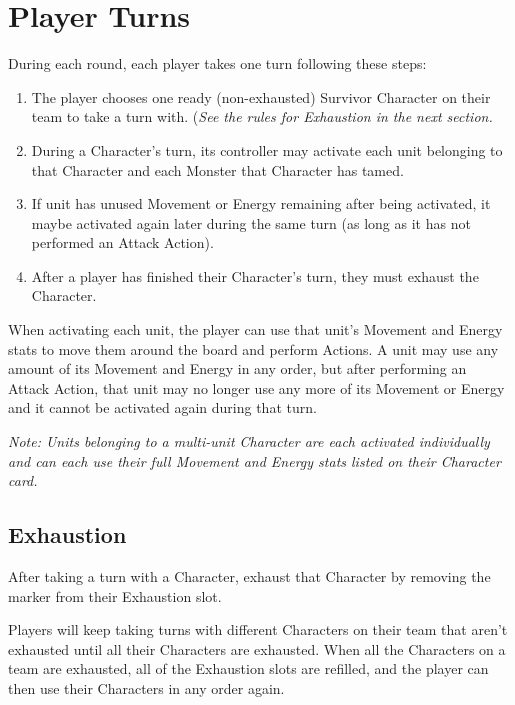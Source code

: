 \documentclass[../main.tex]{subfiles}
\begin{document}
\section{Player Turns}
During each round, each player takes one turn following these steps: 
\begin{enumerate}
    \item The player chooses one ready (non-exhausted) Survivor Character on their team to take a turn with. (\textit{See the rules for Exhaustion in the next section.}
    \item During a Character's turn, its controller may activate each unit belonging to that Character and each Monster that Character has tamed. 
    \item If  unit has unused Movement or Energy remaining after being activated, it maybe activated again later during the same turn (as long as it has not performed an Attack Action). 
    \item After a player has finished their Character's turn, they must exhaust the Character. 
\end{enumerate}

When activating each unit, the player can use that unit's Movement and Energy stats to move them around the board and perform Actions. A unit may use any amount of its Movement and Energy in any order, but after performing an Attack Action, that unit may no longer use any more of its Movement or Energy and it cannot be activated again during that turn. 

\textit{Note: Units belonging to a multi-unit Character are each activated individually and can each use their full Movement and Energy stats listed on their Character card. }

\subsection{Exhaustion}
After taking a turn with a Character, exhaust that Character by removing the marker from their Exhaustion slot. 

Players will keep taking turns with different Characters on their team that aren't exhausted until all their Characters are exhausted. When all the Characters on a team are exhausted, all of the Exhaustion slots are refilled, and the player can then use their Characters in any order again.

\clearpage
\end{document}
